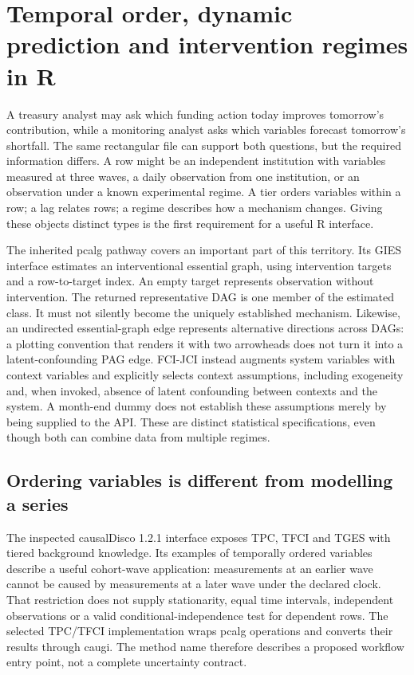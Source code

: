 \section{Temporal order, dynamic prediction and intervention regimes in R}
\label{exec14:r-temporal}

A treasury analyst may ask which funding action today improves tomorrow's
contribution, while a monitoring analyst asks which variables forecast tomorrow's
shortfall. The same rectangular file can support both questions, but the required
information differs. A row might be an independent institution with variables
measured at three waves, a daily observation from one institution, or an
observation under a known experimental regime. A tier orders variables within a
row; a lag relates rows; a regime describes how a mechanism changes. Giving these
objects distinct types is the first requirement for a useful R interface.

The inherited pcalg pathway covers an important part of this territory. Its
GIES interface estimates an interventional essential graph, using intervention
targets and a row-to-target index. An empty target represents observation without
intervention. The returned representative DAG is one member of the estimated
class. It must not silently become the uniquely established mechanism. Likewise,
an undirected essential-graph edge represents alternative directions across
DAGs: a plotting convention that renders it with two arrowheads does not turn
it into a latent-confounding PAG edge. FCI-JCI instead augments system variables
with context variables and explicitly selects context assumptions, including
exogeneity and, when invoked, absence of latent confounding between contexts and
the system. A month-end dummy does not establish these assumptions merely by
being supplied to the API. These are distinct statistical specifications, even
though both can combine data from multiple regimes. \citep{exec13_pcalg,exec13_latentr_primary}

\subsection{Ordering variables is different from modelling a series}

The inspected causalDisco 1.2.1 interface exposes TPC, TFCI and TGES with tiered
background knowledge. Its examples of temporally ordered variables describe a
useful cohort-wave application: measurements at an earlier wave cannot be caused
by measurements at a later wave under the declared clock. That restriction does
not supply stationarity, equal time intervals, independent observations or a
valid conditional-independence test for dependent rows. The selected TPC/TFCI
implementation wraps pcalg operations and converts their results through caugi.
The method name therefore describes a proposed workflow entry point, not a
complete uncertainty contract. \citep{exec14_rtime_causaldisco}

